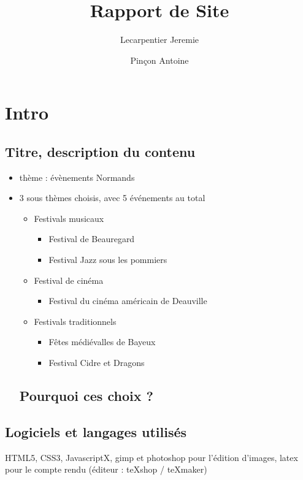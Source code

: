 \documentclass{scrartcl}
\begin{document}
\title{Rapport de Site}
\author{Lecarpentier Jeremie
\and Pinçon Antoine}
\maketitle


\tableofcontents
\listoftables
\listoffigures



\section{Intro}


\subsection{Titre, description du contenu}
\begin{itemize}
\item thème : évènements Normands
\item 3 sous thèmes choisis, avec 5 événements au total
\begin{itemize}
\item Festivals musicaux

\begin{itemize}
\item Festival de Beauregard
\item Festival  Jazz sous les pommiers
\end{itemize}
\item Festival de cinéma
\begin{itemize}
\item Festival du cinéma américain de Deauville
\end{itemize}
\item Festivals traditionnels
\begin{itemize}
\item Fêtes médiévalles de Bayeux
\item Festival Cidre et Dragons
\end{itemize}
\end{itemize}

\subsection{Pourquoi ces choix ?}


\end{itemize}


\subsection{Logiciels et langages utilisés}
HTML5, CSS3, JavascriptX, gimp et photoshop pour l'édition d'images, latex pour le compte rendu (éditeur : teXshop / teXmaker)
\end{document}
